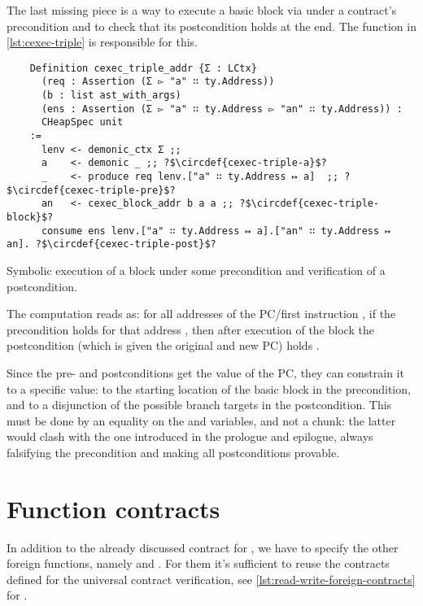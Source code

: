 The last missing piece is a way to execute a basic block via  under a contract's precondition and to check that its postcondition holds at the end. The function  in \cref{lst:cexec-triple} is responsible for this.

\begin{listing}[htb]
  \startcstep
  \begin{verbatim}
    Definition cexec_triple_addr {Σ : LCtx}
      (req : Assertion (Σ ▻ "a" ∷ ty.Address))
      (b : list ast_with_args)
      (ens : Assertion (Σ ▻ "a" ∷ ty.Address ▻ "an" ∷ ty.Address)) :
      CHeapSpec unit
    :=
      lenv <- demonic_ctx Σ ;;
      a    <- demonic _ ;; ?$\circdef{cexec-triple-a}$?
      _    <- produce req lenv.["a" ∷ ty.Address ↦ a]  ;; ?$\circdef{cexec-triple-pre}$?
      an   <- cexec_block_addr b a a ;; ?$\circdef{cexec-triple-block}$?
      consume ens lenv.["a" ∷ ty.Address ↦ a].["an" ∷ ty.Address ↦ an]. ?$\circdef{cexec-triple-post}$?
  \end{verbatim}
  \caption{Symbolic execution of a block under some precondition and verification of a postcondition.}
  \label{lst:cexec-triple}
\end{listing}

The computation reads as: for all addresses of the PC/first instruction , if the precondition holds for that address , then after execution of the block  the postcondition (which is given the original and new PC) holds .

Since the pre- and postconditions get the value of the PC, they can constrain it to a specific value: to the starting location of the basic block in the precondition, and to a disjunction of the possible branch targets in the postcondition. This must be done by an equality on the  and  variables, and not a  chunk: the latter would clash with the one introduced in the prologue and epilogue, always falsifying the precondition and making all postconditions provable.

\section{Function contracts}

In addition to the already discussed contract for , we have to specify the other foreign functions, namely  and . For them it's sufficient to reuse the contracts defined for the universal contract verification, see \cref{lst:read-write-foreign-contracts} for .


